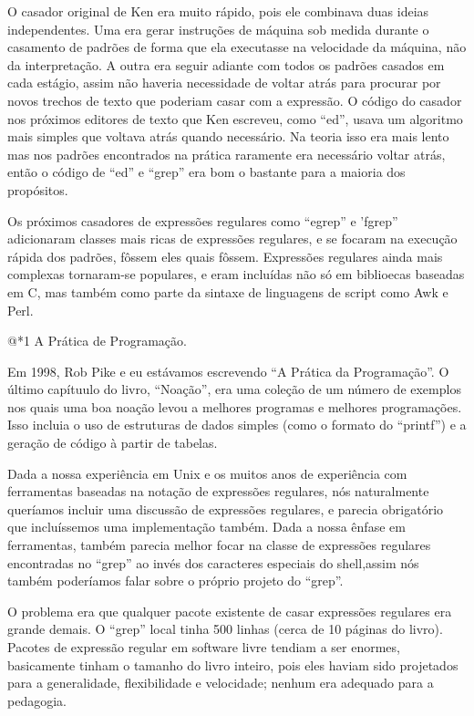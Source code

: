 O casador original de Ken era muito rápido, pois ele combinava duas
ideias independentes. Uma era gerar instruções de máquina sob medida
durante o casamento de padrões de forma que ela executasse na
velocidade da máquina, não da interpretação. A outra era seguir
adiante com todos os padrões casados em cada estágio, assim não
haveria necessidade de voltar atrás para procurar por novos trechos de
texto que poderiam casar com a expressão. O código do casador nos
próximos editores de texto que Ken escreveu, como ``ed'', usava um
algoritmo mais simples que voltava atrás quando necessário. Na teoria
isso era mais lento mas nos padrões encontrados na prática raramente
era necessário voltar atrás, então o código de ``ed'' e ``grep'' era
bom o bastante para a maioria dos propósitos.

Os próximos casadores de expressões regulares como ``egrep'' e
'fgrep'' adicionaram classes mais ricas de expressões regulares, e se
focaram na execução rápida dos padrões, fôssem eles quais
fôssem. Expressões regulares ainda mais complexas tornaram-se
populares, e eram incluídas não só em biblioecas baseadas em C, mas
também como parte da sintaxe de linguagens de script como Awk e Perl.

@*1 A Prática de Programação.

Em 1998, Rob Pike e eu estávamos escrevendo ``A Prática da
Programação''. O último capítuulo do livro, ``Noação'', era uma
coleção de um número de exemplos nos quais uma boa noação levou a
melhores programas e melhores programações. Isso incluia o uso de
estruturas de dados simples (como o formato do ``printf'') e a geração
de código à partir de tabelas.

Dada a nossa experiência em Unix e os muitos anos de experiência com
ferramentas baseadas na notação de expressões regulares, nós
naturalmente queríamos incluir uma discussão de expressões regulares,
e parecia obrigatório que incluíssemos uma implementação também. Dada
a nossa ênfase em ferramentas, também parecia melhor focar na classe
de expressões regulares encontradas no ``grep'' ao invés dos
caracteres especiais do shell,assim nós também poderíamos falar sobre
o próprio projeto do ``grep''.

O problema era que qualquer pacote existente de casar expressões
regulares era grande demais. O ``grep'' local tinha 500 linhas (cerca
de 10 páginas do livro). Pacotes de expressão regular em software
livre tendiam a ser enormes, basicamente tinham o tamanho do livro
inteiro, pois eles haviam sido projetados para a generalidade,
flexibilidade e velocidade; nenhum era adequado para a pedagogia.

